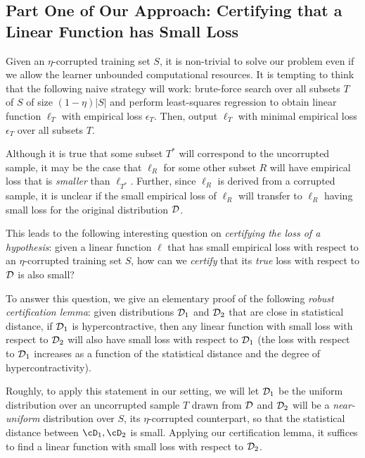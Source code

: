 \subsection{Part One of Our Approach: Certifying that a Linear
  Function has Small Loss}


Given an $\eta$-corrupted training set $S$, it is non-trivial to solve
our problem even if we allow the learner unbounded computational
resources.  It is tempting to think that the following naive strategy
will work: brute-force search over all subsets $T$ of $S$ of size
$(1 - \eta) |S|$ and perform least-squares regression to obtain linear
function $\ell_T$ with empirical loss $\epsilon_T$.  Then,
output $\ell_T$ with minimal empirical loss $\epsilon_T$ over all
subsets $T$.  

Although it is true that some subset $T^{*}$ will correspond to the
uncorrupted sample, it may be the case that $\ell_R$ for some other
subset $R$ will have empirical loss that is {\em smaller} than
$\ell_{T^{*}}$.  Further, since $\ell_R$ is derived from a corrupted sample, it is unclear if the small empirical loss of $\ell_R$ will
transfer to $\ell_R$ having small loss for the original distribution ${\cal D}$.

This leads to the following interesting question on \emph{certifying the loss of a hypothesis}: given a linear function $\ell$ that has small empirical loss with respect to an $\eta$-corrupted training set $S$, how can we {\em
  certify} that its {\em true} loss with respect to ${\cal D}$ is also
small?

To answer this question, we give an elementary proof of the following
\emph{robust certification lemma}: given distributions ${\cal D}_1$ and ${\cal D}_2$ that
are close in statistical distance, if ${\cal D}_1$ is
hypercontractive, then any linear function with small loss with
respect to ${\cal D}_2$ will also have small loss with respect to
${\cal D}_1$ (the loss with respect to ${\cal D}_1$ increases as a
function of the statistical distance and the degree of hypercontractivity).

Roughly, to apply this statement in our setting, we will let
${\cal D}_1$ be the uniform distribution over an uncorrupted sample
$T$ drawn from ${\cal D}$ and ${\cal D}_2$ will be a {\em
  near-uniform} distribution over $S$, its $\eta$-corrupted
counterpart, so that the statistical distance between $\cD_1, \cD_2$ is small.  Applying our certification lemma, it suffices to find a
linear function with small loss with respect to ${\cal D}_2$.
  
